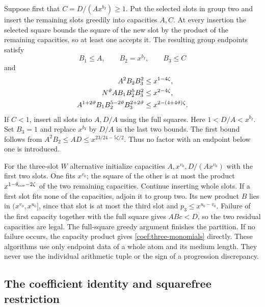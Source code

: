 Suppose first that $C=D/(Ax^{b_I})\ge1$.  Put the selected slots in
group two and insert the remaining slots greedily into capacities $A,C$.
At every insertion the selected square bounds the square of the new
slot by the product of the remaining capacities, so at least one accepts
it.  The resulting group endpoints satisfy
\[
 B_1\le A,\qquad B_2=x^{b_I},\qquad B_3\le C
\]
and
\begin{align}
 A^2B_2B_3^2&\le x^{1-4\zeta},\notag\\
 N^\vartheta AB_1B_2^5B_3^2&\le x^{2-4\zeta},
 \label{coef:three-monomials}\\
 A^{1+2\vartheta}B_1B_2^{5-2\vartheta}B_3^{2+2\vartheta}
 &\le x^{2-(4+4\vartheta)\zeta}.\notag
\end{align}
If $C<1$, insert all slots into $A,D/A$ using the full squares.
Here $1<D/A<x^{b_I}$.  Set $B_3=1$ and replace $x^{b_I}$ by $D/A$
in the last two bounds.  The first bound follows from
$A^2B_2\le AD\le x^{23/24-5\zeta/2}$.  Thus no factor with an
endpoint below one is introduced.

For the three-slot $W$ alternative initialize capacities
$A,x^{v_0},D/(Ax^{v_0})$ with the first two slots.  One fits $x^{v_0}$;
the square of the other is at most the product
$x^{1-\theta_{\rm cov}-2\zeta}$ of the two remaining capacities.  Continue
inserting whole slots.  If a first slot fits none of the capacities,
adjoin it to group two.  Its new product $B$ lies in
$(x^{v_0},x^{u_0}]$, since that slot is at most the third slot and
$p_3\le x^{u_0-v_0}$.  Failure of the first capacity together with the
full square gives $ABc<D$, so the two residual capacities are legal.
The full-square greedy argument finishes the partition.  If no failure
occurs, the capacity product gives \eqref{coef:three-monomials} directly.
These algorithms use only endpoint data of a whole atom and its medium
length.  They never use the individual arithmetic tuple or the sign of
a progression discrepancy.

\subsection{The coefficient identity and squarefree restriction}

